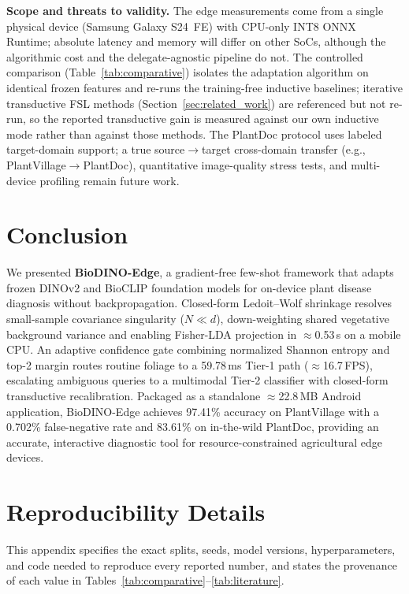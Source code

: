 \documentclass[preprint,12pt]{elsarticle}
\begin{document}
\textbf{Scope and threats to validity.} The edge measurements come from a single physical device (Samsung Galaxy S24~FE) with CPU-only INT8 ONNX Runtime; absolute latency and memory will differ on other SoCs, although the algorithmic cost and the delegate-agnostic pipeline do not. The controlled comparison (Table~\ref{tab:comparative}) isolates the adaptation algorithm on identical frozen features and re-runs the training-free inductive baselines; iterative transductive FSL methods (Section~\ref{sec:related_work}) are referenced but not re-run, so the reported transductive gain is measured against our own inductive mode rather than against those methods. The PlantDoc protocol uses labeled target-domain support; a true source$\rightarrow$target cross-domain transfer (e.g., PlantVillage$\rightarrow$PlantDoc), quantitative image-quality stress tests, and multi-device profiling remain future work.

\section{Conclusion}
\label{sec:conclusion}
We presented \textbf{BioDINO-Edge}, a gradient-free few-shot framework that adapts frozen DINOv2 and BioCLIP foundation models for on-device plant disease diagnosis without backpropagation. Closed-form Ledoit--Wolf shrinkage resolves small-sample covariance singularity ($N \ll d$), down-weighting shared vegetative background variance and enabling Fisher-LDA projection in $\approx$0.53\,s on a mobile CPU. An adaptive confidence gate combining normalized Shannon entropy and top-2 margin routes routine foliage to a 59.78\,ms Tier-1 path ($\approx$16.7\,FPS), escalating ambiguous queries to a multimodal Tier-2 classifier with closed-form transductive recalibration. Packaged as a standalone $\approx$22.8\,MB Android application, BioDINO-Edge achieves 97.41\% accuracy on PlantVillage with a 0.702\% false-negative rate and 83.61\% on in-the-wild PlantDoc, providing an accurate, interactive diagnostic tool for resource-constrained agricultural edge devices.

\appendix
\section{Reproducibility Details}
\label{app:repro}
This appendix specifies the exact splits, seeds, model versions, hyperparameters, and code needed to reproduce every reported number, and states the provenance of each value in Tables~\ref{tab:comparative}--\ref{tab:literature}.
\end{document}
